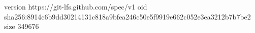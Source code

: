 version https://git-lfs.github.com/spec/v1
oid sha256:8914c6b9dd30214131c818a9bfea246c50e5f9919e662c052e3ea3212b7b7be2
size 349676
